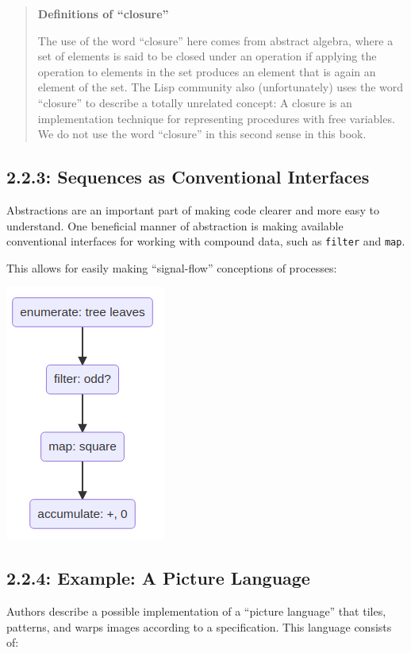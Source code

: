 \documentclass[final,fleqn,titlepage]{article}
\begin{document}
\begin{quote}
\textbf{Definitions of ``closure''}

The use of the word ``closure'' here comes from abstract algebra, where a set of
elements is said to be closed under an operation if applying the operation to
elements in the set produces an element that is again an element of the set.
The Lisp community also (unfortunately) uses the word ``closure'' to describe a
totally unrelated concept: A closure is an implementation technique for
representing procedures with free variables. We do not use the word ``closure''
in this second sense in this book.
\end{quote}

\subsection{2.2.3: Sequences as Conventional Interfaces}
\label{sec:org88d3275}
Abstractions are an important part of making code clearer and more easy to
understand. One beneficial manner of abstraction is making available
conventional interfaces for working with compound data, such as \texttt{filter} and
\texttt{map}.

This allows for easily making ``signal-flow'' conceptions of processes:

\begin{center}
\includegraphics[width=0.3\linewidth]{2/fig/t_2-2-3.png}
\end{center}

\subsection{2.2.4: Example: A Picture Language}
\label{sec:org2ffd601}
Authors describe a possible implementation of a ``picture language'' that tiles,
patterns, and warps images according to a specification. This language consists
of:
\end{document}
